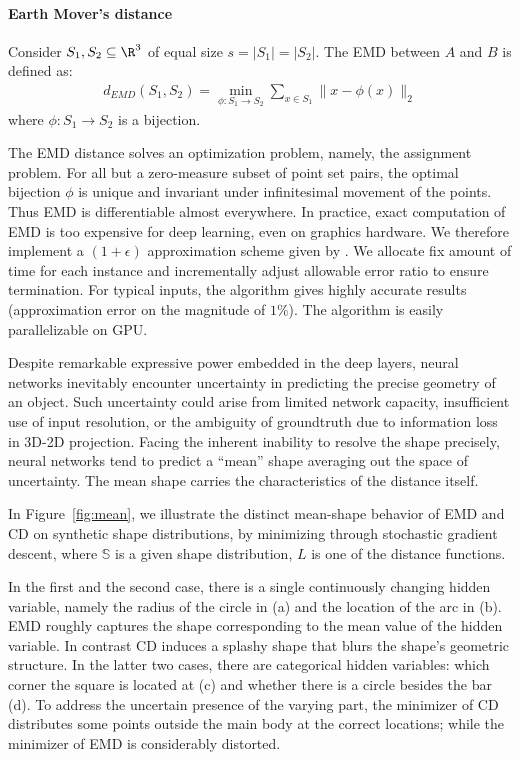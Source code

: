 \documentclass[10pt,twocolumn,letterpaper]{article}
\begin{document}
\paragraph{Earth Mover's distance}Consider $S_1, S_2\subseteq \R^3$ of equal size $s=|S_1|=|S_2|$. The EMD between $A$ and $B$ is defined as:
\begin{align*}
d_{EMD}(S_1, S_2)=\min_{\phi:S_1\rightarrow S_2} \sum_{x\in S_1} \|x-\phi(x)\|_2
\end{align*}
where $\phi:S_1\rightarrow S_2$ is a bijection.

The EMD distance solves an optimization problem, namely, the assignment problem. For all but a zero-measure subset of point set pairs, the optimal bijection $\phi$ is unique and invariant under infinitesimal movement of the points. Thus EMD is differentiable almost everywhere. In practice, exact computation of EMD is too expensive for deep learning, even on graphics hardware. We therefore implement a $(1+\epsilon)$ approximation scheme given by \cite{bertsekas1985distributed}. We allocate fix amount of time for each instance and incrementally adjust allowable error ratio to ensure termination. For typical inputs, the algorithm gives highly accurate results (approximation error on the magnitude of $1\%$). The algorithm is easily parallelizable on GPU.

Despite remarkable expressive power embedded in the deep layers, neural networks inevitably encounter uncertainty in predicting the precise geometry of an object. Such uncertainty could arise from limited network capacity, insufficient use of input resolution, or the ambiguity of groundtruth due to information loss in 3D-2D projection. Facing the inherent inability to resolve the shape precisely, neural networks tend to predict a ``mean'' shape averaging out the space of uncertainty. The mean shape carries the characteristics of the distance itself.

In Figure~\ref{fig:mean}, we illustrate the distinct mean-shape behavior of EMD and CD on synthetic shape distributions, by minimizing
through stochastic gradient descent, where $\mathbb{S}$ is a given shape distribution, $L$ is one of the distance functions. 

In the first and the second case, there is a single continuously changing hidden variable, namely the radius of the circle in (a) and the location of the arc in (b). EMD roughly captures the shape corresponding to the mean value of the hidden variable. In contrast CD induces a splashy shape that blurs the shape's geometric structure. In the latter two cases, there are categorical hidden variables: which corner the square is located at (c) and whether there is a circle besides the bar (d). To address the uncertain presence of the varying part, the minimizer of CD distributes some points outside the main body at the correct locations; while the minimizer of EMD is considerably distorted.
\end{document}

